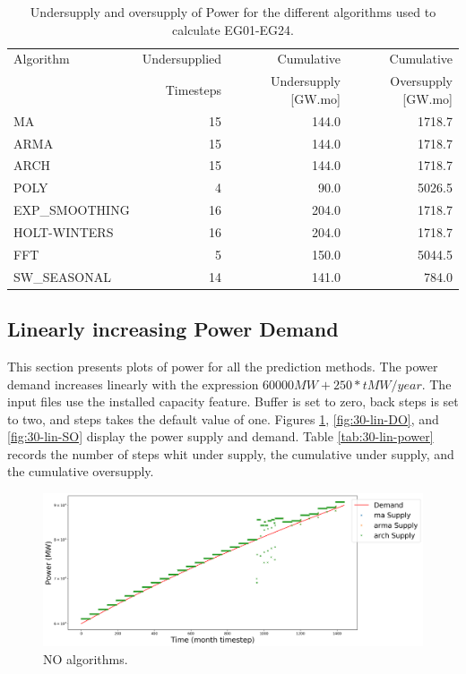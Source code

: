 \documentclass[11pt]{article}
\begin{document}
\begin{table}[H]
	\centering
	\caption{Undersupply and oversupply of Power for the different algorithms used to calculate EG01-EG24.}
	\label{tab:30-power}
	\begin{tabularx}{\textwidth}{lRRR}
		\hline
		Algorithm & Undersupplied & Cumulative  & Cumulative \\
		& Timesteps     & Undersupply [GW.mo]  & Oversupply [GW.mo] \\ \hline
		MA        & 15 & 144.0 & 1718.7 \\ 
		ARMA      & 15 & 144.0 & 1718.7 \\ 
		ARCH      & 15 & 144.0 & 1718.7 \\ 
		POLY      & 4  & 90.0 & 5026.5 \\ 
		EXP\_SMOOTHING 	& 16 & 204.0 & 1718.7 \\ 
		HOLT-WINTERS  	& 16 & 204.0 & 1718.7 \\ 
		FFT       & 5 & 150.0 & 5044.5 \\ 
		SW\_SEASONAL    & 14 & 141.0 & 784.0 \\ \hline
	\end{tabularx}
\end{table}

\subsection{Linearly increasing Power Demand}

This section presents plots of power for all the prediction methods. The power demand increases linearly with the expression $60000 MW + 250*t MW/year$. The input files use the installed capacity feature. Buffer is set to zero, back steps is set to two, and steps takes the default value of one.
Figures \ref{fig:30-lin-NO}, \ref{fig:30-lin-DO}, and \ref{fig:30-lin-SO} display the power supply and demand.
Table \ref{tab:30-lin-power} records the number of steps whit under supply, the cumulative under supply, and the cumulative oversupply.

\begin{figure}[H]
	\centering
	\includegraphics[width=\textwidth]{30-figures/lin-30-power-buffer01.png} 
	\hfill
	\caption{NO algorithms.}
	\label{fig:30-lin-NO}
\end{figure}
\end{document}
